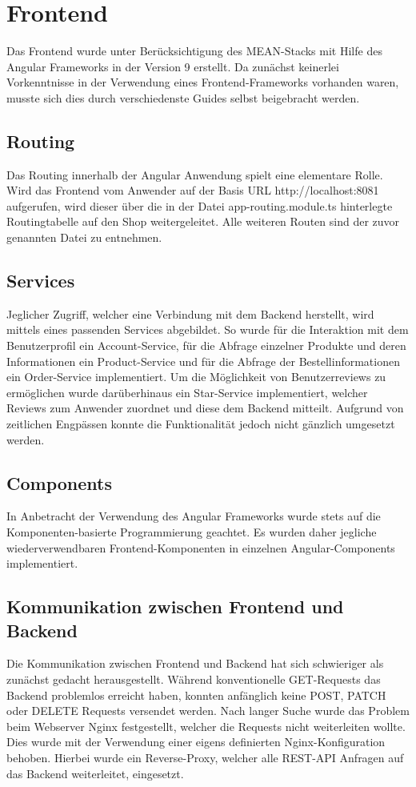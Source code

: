 \chapter{Frontend}\label{ch:frontend}
Das Frontend wurde unter Berücksichtigung des MEAN-Stacks mit Hilfe des Angular Frameworks in der Version 9 erstellt. Da zunächst keinerlei Vorkenntnisse in der Verwendung eines Frontend-Frameworks vorhanden waren, musste sich dies durch verschiedenste Guides selbst beigebracht werden.
\section{Routing}
Das Routing innerhalb der Angular Anwendung spielt eine elementare Rolle. Wird das Frontend vom Anwender auf der Basis URL http://localhost:8081 aufgerufen, wird dieser über die in der Datei app-routing.module.ts hinterlegte Routingtabelle auf den Shop weitergeleitet. Alle weiteren Routen sind der zuvor genannten Datei zu entnehmen.

\section{Services}
Jeglicher Zugriff, welcher eine Verbindung mit dem Backend herstellt, wird mittels eines passenden Services abgebildet. So wurde für die Interaktion mit dem Benutzerprofil ein Account-Service, für die Abfrage einzelner Produkte und deren Informationen ein Product-Service und für die Abfrage der Bestellinformationen ein Order-Service implementiert. Um die Möglichkeit von Benutzerreviews zu ermöglichen wurde darüberhinaus ein Star-Service implementiert, welcher Reviews zum Anwender zuordnet und diese dem Backend mitteilt. Aufgrund von zeitlichen Engpässen konnte die Funktionalität jedoch nicht gänzlich umgesetzt werden.

\section{Components}
In Anbetracht der Verwendung des Angular Frameworks wurde stets auf die Komponenten-basierte Programmierung geachtet. Es wurden daher jegliche wiederverwendbaren Frontend-Komponenten in einzelnen Angular-Components implementiert.

\section{Kommunikation zwischen Frontend und Backend}
Die Kommunikation zwischen Frontend und Backend hat sich schwieriger als zunächst gedacht herausgestellt. Während konventionelle GET-Requests das Backend problemlos erreicht haben, konnten anfänglich keine POST, PATCH oder DELETE Requests versendet werden. Nach langer Suche wurde das Problem beim Webserver Nginx festgestellt, welcher die Requests nicht weiterleiten wollte. Dies wurde mit der Verwendung einer eigens definierten Nginx-Konfiguration behoben. Hierbei wurde ein Reverse-Proxy, welcher alle REST-API Anfragen auf das Backend weiterleitet, eingesetzt.

